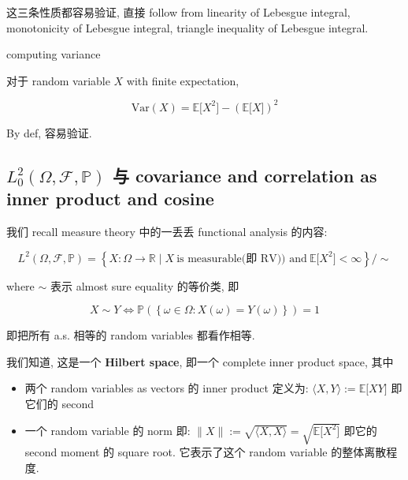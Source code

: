\documentclass{qlnotes-export}
\begin{document}
这三条性质都容易验证, 直接 follow from linearity of Lebesgue integral, monotonicity of Lebesgue integral, triangle inequality of Lebesgue integral.

\begin{proposition}{computing variance}\label{prop-02-random-variables-computing-variance}

对于 random variable \(X\) with finite expectation,

\[\text{Var}(X) = {\mathbb{E}}\lbrack X^{2}\rbrack - ({\mathbb{E}}\lbrack X\rbrack)^{2}\]

\end{proposition}

By def, 容易验证.

\subsection{\texorpdfstring{\(L_{0}^{2}(\Omega,\mathcal{F},{\mathbb{P}})\) 与 covariance and correlation as inner product and cosine}{L\_\{0\}\^{}\{2\}(\textbackslash Omega,\textbackslash mathcal\{F\},\{\textbackslash mathbb\{P\}\}) 与 covariance and correlation as inner product and cosine}}\label{l_02omegamathcalfmathbbp-ux4e0e-covariance-and-correlation-as-inner-product-and-cosine}

我们 recall measure theory 中的一丢丢 functional analysis 的内容:

\[L^{2}(\Omega,\mathcal{F},{\mathbb{P}}) = \left\{ {X:\Omega\rightarrow{\mathbb{R}} \mid X\ \text{is measurable(即 RV)) and}\ {\mathbb{E}}\lbrack X^{2}\rbrack < \infty} \right\}/ \sim\]

where \(\sim\) 表示 almost sure equality 的等价类, 即

\[X \sim Y\Leftrightarrow{\mathbb{P}}(\left\{ {\omega \in \Omega:X(\omega) = Y(\omega)} \right\}) = 1\]

即把所有 a.s. 相等的 random variables 都看作相等.

我们知道, 这是一个 \textbf{Hilbert space}, 即一个 complete inner product space, 其中

\begin{itemize}
\item
  两个 random variables as vectors 的 inner product 定义为: \(\langle X,Y\rangle := {\mathbb{E}}\lbrack XY\rbrack\) 即它们的 second
\item
  一个 random variable 的 norm 即: \(\parallel X \parallel := \sqrt{\langle X,X\rangle} = \sqrt{{\mathbb{E}}\lbrack X^{2}\rbrack}\) 即它的 second moment 的 square root. 它表示了这个 random variable 的整体离散程度.
\end{itemize}
\end{document}

